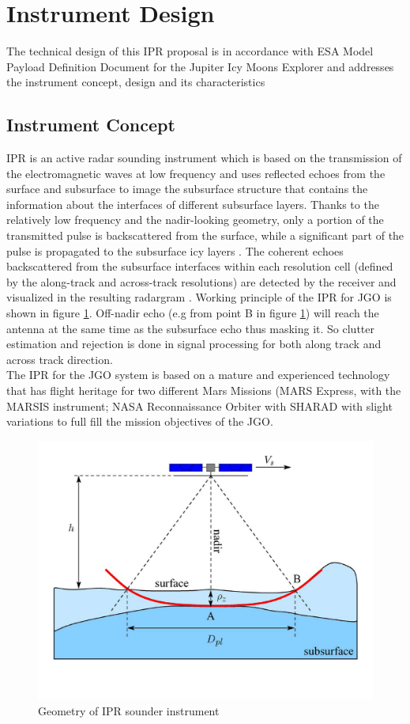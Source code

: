 \section{Instrument Design}
\label{IPR_design}
The technical design of this \ac{IPR} proposal is in accordance with ESA Model Payload Definition Document for the Jupiter Icy Moons Explorer \cite{JGO_Payload_def} and addresses the instrument concept, design and its characteristics 
\subsection{Instrument Concept}
\ac{IPR} is an active radar sounding instrument which is based on the transmission of the electromagnetic waves at low frequency and uses reflected echoes from the surface and subsurface to image the subsurface structure that contains the information about the interfaces of different subsurface layers. Thanks to the relatively low frequency and the nadir-looking geometry, only a portion of the transmitted pulse is backscattered from the surface, while a significant part of the pulse is propagated to the subsurface icy layers \cite{Gany_SRS}. The coherent echoes backscattered from the subsurface interfaces within each resolution cell (defined by the along-track and across-track resolutions) are detected by the receiver and visualized in the resulting radargram \cite{Gany_SRS}. Working principle of the \ac{IPR} for \ac{JGO} is shown in figure \ref{fig:IPR_concept}. Off-nadir echo (e.g from point B in figure \ref{fig:IPR_concept}) will reach the antenna at the same time as the subsurface echo thus masking it. So clutter estimation and rejection is done in signal processing for both along track and across track direction.\\
%
The \ac{IPR} for the \ac{JGO} system is based on a mature and experienced technology that has flight heritage for two different Mars Missions (MARS Express, with the \ac{MARSIS} instrument; NASA Reconnaissance Orbiter with \ac{SHARAD} with slight variations to full fill  the mission objectives of the \ac{JGO}.
%
\begin{figure}[bht]
\centering
\includegraphics[scale=0.5]{Figures/IPR_Concept.pdf}
\caption{Geometry of \ac{IPR} sounder instrument \cite{Gany_SRS}} 
\label{fig:IPR_concept}
\end{figure}
%
